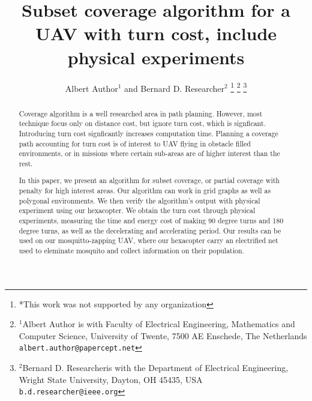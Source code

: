 \documentclass[letterpaper, 10 pt, conference]{ieeeconf}  %
\title{\LARGE \bf
Subset coverage algorithm for a UAV with turn cost, include physical experiments
}
\author{Albert Author$^{1}$ and Bernard D. Researcher$^{2}$%
\thanks{*This work was not supported by any organization}%
\thanks{$^{1}$Albert Author is with Faculty of Electrical Engineering, Mathematics and Computer Science,
        University of Twente, 7500 AE Enschede, The Netherlands
        {\tt\small albert.author@papercept.net}}%
\thanks{$^{2}$Bernard D. Researcheris with the Department of Electrical Engineering, Wright State University,
        Dayton, OH 45435, USA
        {\tt\small b.d.researcher@ieee.org}}%
}
\begin{document}
\maketitle
\thispagestyle{empty}
\pagestyle{empty}


\begin{abstract}

Coverage algorithm is a well researched area in path planning. However, most technique focus only on distance cost, but ignore turn cost, which is signficant. Introducing turn cost signficantly increases computation time. Planning a coverage path accounting for turn cost is of interest to UAV flying in obstacle filled environments, or in missions where certain sub-areas are of higher interest than the rest.
	
In this paper, we present an algorithm for subset coverage, or partial coverage with penalty for high interest areas. Our algorithm can work in grid graphs as well as polygonal environments. We then verify the algorithm's output with physical experiment using our hexacopter. We obtain the turn cost through physical experiments, measuring the time and energy cost of making 90 degree turns and 180 degree turns, as well as the decelerating and accelerating period. Our results can be used on our mosquitto-zapping UAV, where our hexacopter carry an electrified net used to eleminate mosquito and collect information on their population.

\end{abstract}














\end{document}
